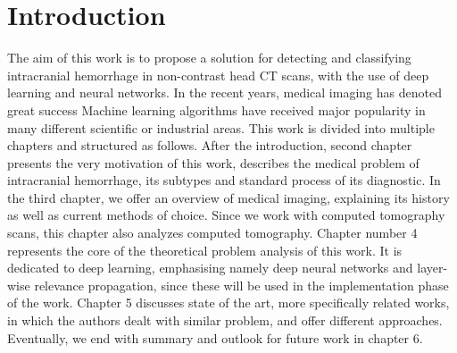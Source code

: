 \chapter{Introduction}

The aim of this work is to propose a solution for detecting and classifying intracranial hemorrhage in non-contrast head CT scans, with the use of deep learning and neural networks. 
In the recent years, medical imaging has denoted great success
Machine learning algorithms have received major popularity in many different scientific or industrial areas.  
This work is divided into multiple chapters and structured as follows. After the introduction, second chapter presents the very motivation of this work, describes the medical problem of intracranial hemorrhage, its subtypes and standard process of its diagnostic. In the third chapter, we offer an overview of medical imaging, explaining its history as well as current methods of choice. Since we work with computed tomography scans, this chapter also analyzes computed tomography. Chapter number 4 represents the core of the theoretical problem analysis of this work. It is dedicated to deep learning, emphasising namely deep neural networks and layer-wise relevance propagation, since these will be used in the implementation phase of the work. Chapter 5 discusses state of the art, more specifically related works, in which the authors dealt with similar problem, and offer different approaches. Eventually, we end with summary and outlook for future work in chapter 6.

